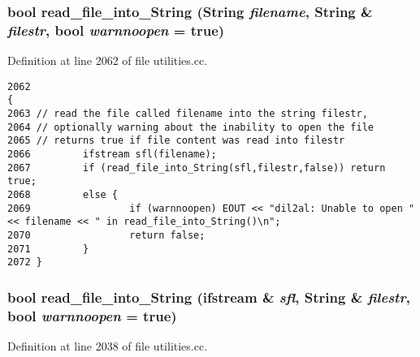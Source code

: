 \subsubsection{\setlength{\rightskip}{0pt plus 5cm}bool read\_\-file\_\-into\_\-String ({\bf String} {\em filename}, {\bf String} \& {\em filestr}, bool {\em warnnoopen} = {\bf true})}\label{dil2al_8hh_a236}




Definition at line 2062 of file utilities.cc.



\footnotesize\begin{verbatim}2062                                                                                       {
2063 // read the file called filename into the string filestr,
2064 // optionally warning about the inability to open the file
2065 // returns true if file content was read into filestr
2066         ifstream sfl(filename);
2067         if (read_file_into_String(sfl,filestr,false)) return true;
2068         else {
2069                 if (warnnoopen) EOUT << "dil2al: Unable to open " << filename << " in read_file_into_String()\n";
2070                 return false;
2071         }
2072 }
\end{verbatim}\normalsize 
{}
\subsubsection{\setlength{\rightskip}{0pt plus 5cm}bool read\_\-file\_\-into\_\-String (ifstream \& {\em sfl}, {\bf String} \& {\em filestr}, bool {\em warnnoopen} = {\bf true})}\label{dil2al_8hh_a235}




Definition at line 2038 of file utilities.cc.



